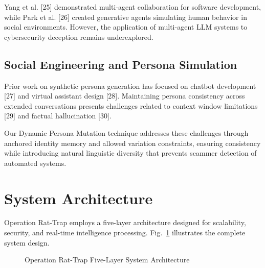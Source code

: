 \documentclass[conference]{IEEEtran}
\begin{document}
Yang et al. [25] demonstrated multi-agent collaboration for software development, while Park et al. [26] created generative agents simulating human behavior in social environments. However, the application of multi-agent LLM systems to cybersecurity deception remains underexplored.

\subsection{Social Engineering and Persona Simulation}

Prior work on synthetic persona generation has focused on chatbot development [27] and virtual assistant design [28]. Maintaining persona consistency across extended conversations presents challenges related to context window limitations [29] and factual hallucination [30].

Our Dynamic Persona Mutation technique addresses these challenges through anchored identity memory and allowed variation constraints, ensuring consistency while introducing natural linguistic diversity that prevents scammer detection of automated systems.

\section{System Architecture}

Operation Rat-Trap employs a five-layer architecture designed for scalability, security, and real-time intelligence processing. Fig.~\ref{fig:architecture} illustrates the complete system design.

\begin{figure}[htbp]
\centerline{}
\caption{Operation Rat-Trap Five-Layer System Architecture}
\label{fig:architecture}
\end{figure}
\end{document}
